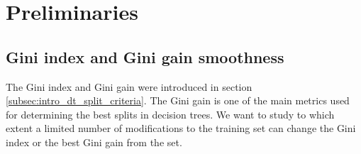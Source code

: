 \section{Preliminaries}
\subsection{Gini index and Gini gain smoothness}
The Gini index and Gini gain were introduced in section \ref{subsec:intro_dt_split_criteria}. The Gini gain is one of the main metrics used for determining the best splits in decision trees. We want to study to which extent a limited number of modifications to the training set can change the Gini index or the best Gini gain from the set. 

